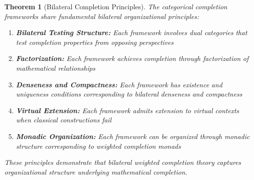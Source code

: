 \documentclass[11pt]{article}
\theoremstyle{plain}
\newtheorem{theorem}{Theorem}[section]
\theoremstyle{definition}
\theoremstyle{remark}
\begin{document}
\begin{theorem}[Bilateral Completion Principles]\label{thm:universal-bilateral-principles}
The categorical completion frameworks share fundamental bilateral organizational principles:

\begin{enumerate}
\item \textbf{Bilateral Testing Structure:} Each framework involves dual categories that test completion properties from opposing perspectives

\item \textbf{Factorization:} Each framework achieves completion through factorization of mathematical relationships

\item \textbf{Denseness and Compactness:} Each framework has existence and uniqueness conditions corresponding to bilateral denseness and compactness

\item \textbf{Virtual Extension:} Each framework admits extension to virtual contexts when classical constructions fail

\item \textbf{Monadic Organization:} Each framework can be organized through monadic structure corresponding to weighted completion monads
\end{enumerate}

These principles demonstrate that bilateral weighted completion theory captures organizational structure underlying mathematical completion.
\end{theorem}
\end{document}
